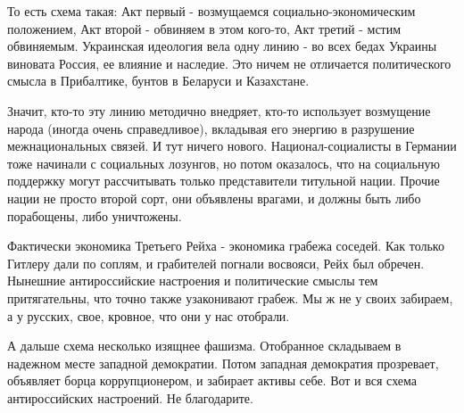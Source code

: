 То есть схема такая: Акт первый - возмущаемся социально-экономическим
положением, Акт второй - обвиняем в этом кого-то, Акт третий - мстим
обвиняемым. Украинская идеология  вела одну линию - во всех бедах Украины
виновата Россия, ее влияние и наследие. Это ничем не отличается политического
смысла в Прибалтике, бунтов в Беларуси и Казахстане. 

Значит, кто-то эту линию методично внедряет, кто-то использует возмущение
народа (иногда очень справедливое), вкладывая его энергию в разрушение
межнациональных связей. И тут ничего нового. Национал-социалисты в Германии
тоже начинали с социальных лозунгов, но потом оказалось, что на социальную
поддержку могут рассчитывать только представители титульной нации. Прочие нации
не просто второй сорт, они объявлены врагами, и должны быть либо порабощены,
либо уничтожены. 

Фактически экономика Третьего Рейха - экономика грабежа соседей. Как только
Гитлеру дали по соплям, и грабителей погнали восвояси, Рейх был обречен.
Нынешние антироссийские настроения и политические смыслы тем притягательны, что
точно также узаконивают грабеж. Мы ж не у своих забираем, а у русских, свое,
кровное, что они у нас отобрали.

А дальше схема несколько изящнее фашизма. Отобранное складываем в надежном
месте западной демократии. Потом западная демократия прозревает, объявляет
борца коррупционером, и забирает активы себе. Вот и вся схема антироссийских
настроений. Не благодарите.

